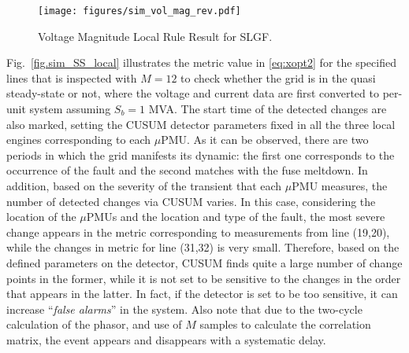 \documentclass[twocolumn]{IEEEtran}
\newcommand{\mup}{\mu \text{PMU}}
\begin{document}
\begin{figure}[ht]
\centering 
\texttt{[image: figures/sim\_vol\_mag\_rev.pdf]}
\caption{ Voltage Magnitude Local Rule Result for SLGF.}
\label{fig.sim_vol_mag}
\end{figure}
Fig.~\ref{fig.sim_SS_local} illustrates the metric value in \eqref{eq:xopt2} for the specified lines that is inspected with $M=12$ to check whether the grid is in the quasi steady-state or not, where the voltage and current data are first converted to per-unit system assuming $S_b=1$ MVA. The start time of the detected changes are also marked, setting the CUSUM detector parameters fixed in all the three local engines corresponding to each $\mup$. As it can be observed, there are two periods in which the grid manifests its dynamic: the first one corresponds to the occurrence of the fault and the second matches with the fuse meltdown. In addition, based on the severity of the transient that each $\mup$ measures, the number of detected changes via CUSUM varies. In this case, considering the location of the $\mup$s and the location and type of the fault, the most severe change appears in the metric corresponding to measurements from line (19,20), while the changes in metric for line (31,32) is very small. Therefore, based on the defined parameters on the detector, CUSUM finds quite a large number of change points in the former, while it is not set to be sensitive to the changes in the order that appears in the latter. In fact, if the detector is set to be too sensitive, it can increase ``\textit{false alarms}'' in the system. 
Also note that due to the two-cycle calculation of the phasor, and use of $M$ samples to calculate the correlation matrix, the event appears and disappears with a systematic delay.      
\end{document}
